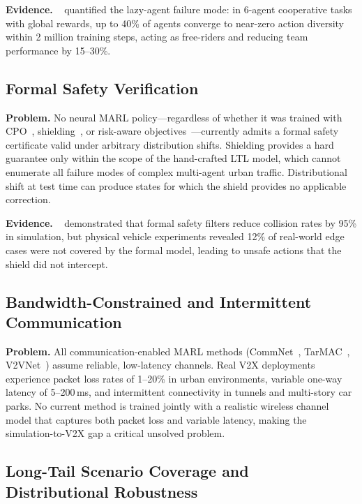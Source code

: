 \documentclass[12pt, a4paper]{article}
\begin{document}
\textbf{Evidence.}  \citeauthor{su2021vdac}~\cite{su2021vdac} quantified
the lazy-agent failure mode: in 6-agent cooperative tasks with global rewards,
up to 40\% of agents converge to near-zero action diversity within 2 million
training steps, acting as free-riders and reducing team performance by 15--30\%.

\subsection{Formal Safety Verification}
\label{sec:ch_safety}

\textbf{Problem.}  No neural MARL policy---regardless of whether it was
trained with CPO~\cite{achiam2017constrained}, shielding~\cite{alshiekh2018safe},
or risk-aware objectives~\cite{prashanth2016variance}---currently admits a
formal safety certificate valid under arbitrary distribution shifts.  Shielding
provides a hard guarantee only within the scope of the hand-crafted LTL model,
which cannot enumerate all failure modes of complex multi-agent urban traffic.
Distributional shift at test time can produce states for which the shield
provides no applicable correction.

\textbf{Evidence.}  \citeauthor{shalev2016safe}~\cite{shalev2016safe}
demonstrated that formal safety filters reduce collision rates by 95\% in
simulation, but physical vehicle experiments revealed 12\% of real-world
edge cases were not covered by the formal model, leading to unsafe actions
that the shield did not intercept.

\subsection{Bandwidth-Constrained and Intermittent Communication}
\label{sec:ch_comm}

\textbf{Problem.}  All communication-enabled MARL methods
(CommNet~\cite{sukhbaatar2016learning}, TarMAC~\cite{das2019tarmac},
V2VNet~\cite{wang2020v2vnet}) assume reliable, low-latency channels.
Real V2X deployments experience packet loss rates of 1--20\% in urban
environments, variable one-way latency of 5--200\,ms, and intermittent
connectivity in tunnels and multi-story car parks.  No current method is
trained jointly with a realistic wireless channel model that captures
both packet loss and variable latency, making the simulation-to-V2X gap
a critical unsolved problem.

\subsection{Long-Tail Scenario Coverage and Distributional Robustness}
\label{sec:ch_longtail}
\end{document}

